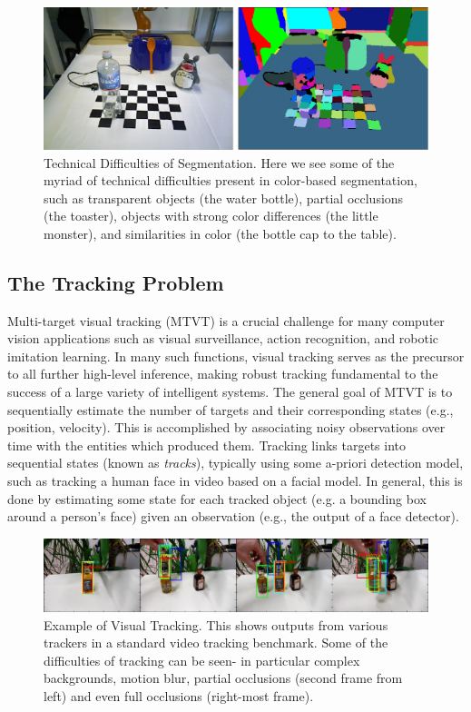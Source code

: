 \begin{figure}
\label{fig:SegmentationProblems}
\centering
\includegraphics[width=\linewidth]{figures/Introduction/Segmentation_Problems.pdf}
\caption[Technical Difficulties of Segmentation]{Technical Difficulties of Segmentation. Here we see some of the myriad of technical difficulties present in color-based segmentation, such as transparent objects (the water bottle), partial occlusions (the toaster), objects with strong color differences (the little monster), and similarities in color (the bottle cap to the table).}
\end{figure}


\subsection{The Tracking Problem}
Multi-target visual tracking (MTVT) is a crucial challenge for many computer vision applications such as visual surveillance, action recognition, and robotic imitation learning. In many such functions, visual tracking serves as the precursor to all further high-level inference, making robust tracking fundamental to the success of a large variety of intelligent systems. The general goal of MTVT is to sequentially estimate the number of targets and their corresponding states (e.g., position, velocity). This is accomplished by associating noisy observations over time with the entities which produced them. Tracking links targets into sequential states (known as \emph{tracks}), typically using some a-priori detection model, such as tracking a human face in video based on a facial model. In general, this is done by estimating some state for each tracked object (e.g. a bounding box around a person's face) given an observation (e.g., the output of a face detector).

\begin{figure}
\label{fig:ExampleTracking}
\centering
\includegraphics[width=\linewidth]{figures/Introduction/Tracking_Example.pdf}
\caption[Example of Visual Tracking]{Example of Visual Tracking. This shows outputs from various trackers in a standard video tracking benchmark. Some of the difficulties of tracking can be seen- in particular complex backgrounds, motion blur, partial occlusions (second frame from left) and even full occlusions (right-most frame).}
\end{figure}

